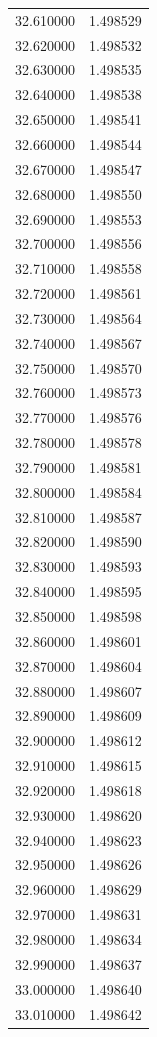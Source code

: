 \begin{tabular}{rr}
32.610000 & 1.498529 \\
32.620000 & 1.498532 \\
32.630000 & 1.498535 \\
32.640000 & 1.498538 \\
32.650000 & 1.498541 \\
32.660000 & 1.498544 \\
32.670000 & 1.498547 \\
32.680000 & 1.498550 \\
32.690000 & 1.498553 \\
32.700000 & 1.498556 \\
32.710000 & 1.498558 \\
32.720000 & 1.498561 \\
32.730000 & 1.498564 \\
32.740000 & 1.498567 \\
32.750000 & 1.498570 \\
32.760000 & 1.498573 \\
32.770000 & 1.498576 \\
32.780000 & 1.498578 \\
32.790000 & 1.498581 \\
32.800000 & 1.498584 \\
32.810000 & 1.498587 \\
32.820000 & 1.498590 \\
32.830000 & 1.498593 \\
32.840000 & 1.498595 \\
32.850000 & 1.498598 \\
32.860000 & 1.498601 \\
32.870000 & 1.498604 \\
32.880000 & 1.498607 \\
32.890000 & 1.498609 \\
32.900000 & 1.498612 \\
32.910000 & 1.498615 \\
32.920000 & 1.498618 \\
32.930000 & 1.498620 \\
32.940000 & 1.498623 \\
32.950000 & 1.498626 \\
32.960000 & 1.498629 \\
32.970000 & 1.498631 \\
32.980000 & 1.498634 \\
32.990000 & 1.498637 \\
33.000000 & 1.498640 \\
33.010000 & 1.498642 \\

\end{tabular}
